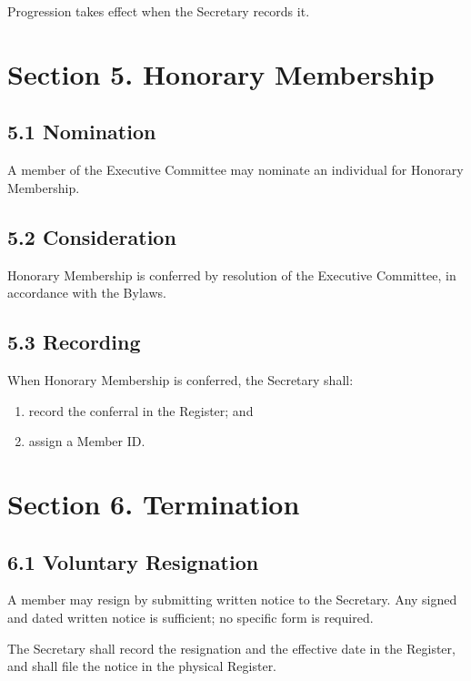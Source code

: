 \documentclass[a4paper]{article}
\begin{document}
Progression takes effect when the Secretary records it.

\section*{Section 5. Honorary Membership}

\subsection*{5.1 Nomination}
A member of the Executive Committee may nominate an individual for
Honorary Membership.

\subsection*{5.2 Consideration}

Honorary Membership is conferred by resolution of the Executive
Committee, in accordance with the Bylaws.

\subsection*{5.3 Recording}
When Honorary Membership is conferred, the Secretary shall:
\begin{enumerate}
  \item record the conferral in the Register; and
  \item assign a Member ID.
\end{enumerate}

\section*{Section 6. Termination}

\subsection*{6.1 Voluntary Resignation}
A member may resign by submitting written notice to the Secretary. Any
signed and dated written notice is sufficient; no specific form is
required.

The Secretary shall record the resignation and the effective date in
the Register, and shall file the notice in the physical Register.
\end{document}

